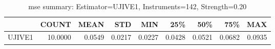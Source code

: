 \begin{table}[ht]
\centering
\caption{mse summary: Estimator=UJIVE1, Instruments=142, Strength=0.20}
\begin{tabular}{lrrrrrrrr}
\toprule
 & COUNT & MEAN & STD & MIN & 25\% & 50\% & 75\% & MAX \\
\midrule
UJIVE1 & 10.0000 & 0.0549 & 0.0217 & 0.0227 & 0.0428 & 0.0521 & 0.0682 & 0.0935 \\
\bottomrule
\end{tabular}
\end{table}
